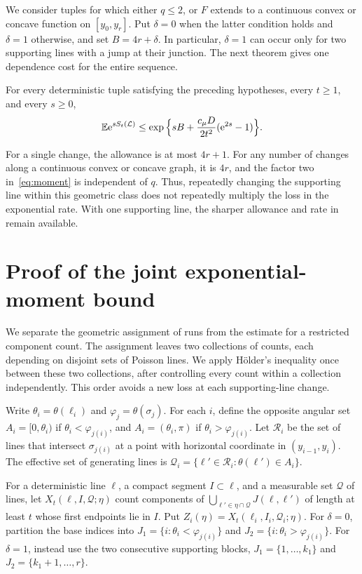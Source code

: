 \documentclass[11pt,letterpaper]{article}
\begin{document}
We consider tuples for which either $q\le2$, or $F$ extends to a continuous convex or concave function on $[y_0,y_r]$. Put $\delta=0$ when the latter condition holds and $\delta=1$ otherwise, and set $B=4r+\delta$. In particular, $\delta=1$ can occur only for two supporting lines with a jump at their junction. The next theorem gives one dependence cost for the entire sequence.

\begin{theorem}\label{thm:changes}
For every deterministic tuple satisfying the preceding hypotheses, every $t\ge1$, and every $s\ge0$,
\begin{equation}\label{eq:moment}
 \mathbb E\mathrm{e}^{sS_t(\mathcal L)}
 \le\exp\Big\{sB+\frac{c_\mu D}{2t^2}(\mathrm{e}^{2s}-1)\Big\}.
\end{equation}
\end{theorem}

For a single change, the allowance is at most $4r+1$. For any number of changes along a continuous convex or concave graph, it is $4r$, and the factor two in~\eqref{eq:moment} is independent of $q$. Thus, repeatedly changing the supporting line within this geometric class does not repeatedly multiply the loss in the exponential rate. With one supporting line, the sharper allowance and rate in~\cite{ORC26} remain available.

\section{Proof of the joint exponential-moment bound}

We separate the geometric assignment of runs from the estimate for a restricted component count. The assignment leaves two collections of counts, each depending on disjoint sets of Poisson lines. We apply H\"older's inequality once between these two collections, after controlling every count within a collection independently. This order avoids a new loss at each supporting-line change.

Write $\theta_i=\theta(\ell_i)$ and $\varphi_j=\theta(\sigma_j)$. For each $i$, define the opposite angular set $A_i=[0,\theta_i)$ if $\theta_i<\varphi_{j(i)}$, and $A_i=(\theta_i,\pi)$ if $\theta_i>\varphi_{j(i)}$. Let $\mathscr R_i$ be the set of lines that intersect $\sigma_{j(i)}$ at a point with horizontal coordinate in $(y_{i-1},y_i)$. The effective set of generating lines is $\mathscr Q_i=\{\ell'\in\mathscr R_i:\theta(\ell')\in A_i\}$.

For a deterministic line $\ell$, a compact segment $I\subset\ell$, and a measurable set $\mathscr Q$ of lines, let $X_t(\ell,I,\mathscr Q;\eta)$ count components of $\bigcup_{\ell'\in\eta\cap\mathscr Q}J(\ell,\ell')$ of length at least $t$ whose first endpoints lie in $I$. Put $Z_i(\eta)=X_t(\ell_i,I_i,\mathscr Q_i;\eta)$. For $\delta=0$, partition the base indices into $J_1=\{i:\theta_i<\varphi_{j(i)}\}$ and $J_2=\{i:\theta_i>\varphi_{j(i)}\}$. For $\delta=1$, instead use the two consecutive supporting blocks, $J_1=\{1,\ldots,k_1\}$ and $J_2=\{k_1+1,\ldots,r\}$.
\end{document}
